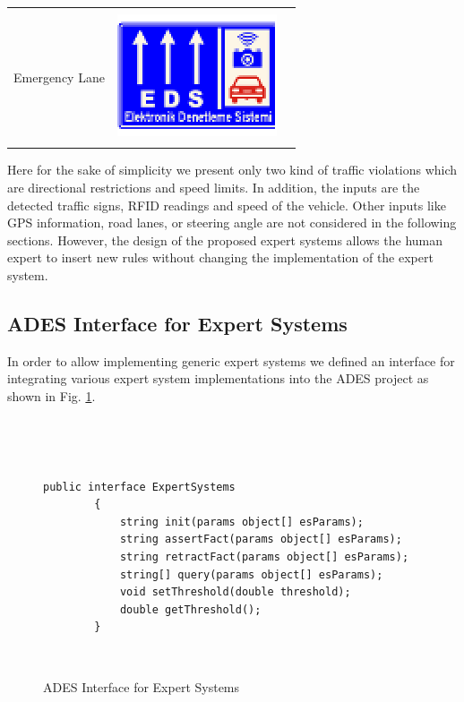 \documentclass[letterpaper, 10 pt, conference]{ieeeconf}
\newenvironment{mylisting}
{~\par~\begin{list}{}{\setlength{\leftmargin}{1em}}\item\scriptsize\bfseries}
{\end{list}~\par}
\begin{document}
\begin{table}[!ht]
{\begin{tabular}{|r|r|c|}
\cline{1-2}
&&\\
Emergency Lane &  \includegraphics[scale=0.25]{img/eds} & \\
&&\\
\hline
\end{tabular}  
}
\label{viol}
\end{table}

Here for the sake of simplicity we present only two kind of traffic violations which are directional restrictions and speed limits. In addition, the inputs are the detected traffic signs, RFID readings and speed of the vehicle. Other inputs like GPS information, road lanes, or steering angle are not considered in the following sections. However, the design of the proposed expert systems allows the human expert to insert new rules without changing the implementation of the expert system.

\subsection{ADES Interface for Expert Systems}

In order to allow implementing generic expert systems  we defined an interface for integrating various expert system implementations into the ADES project as shown in Fig. \ref{fig:interface}. 

\begin{figure}[!ht]
      \centering

\begin{mylisting}

\begin{verbatim}
public interface ExpertSystems
        {
            string init(params object[] esParams);
            string assertFact(params object[] esParams);
            string retractFact(params object[] esParams);
            string[] query(params object[] esParams);
            void setThreshold(double threshold);
            double getThreshold();
        }
\end{verbatim}
\end{mylisting}
      \caption{ADES Interface for Expert Systems}
      \label{fig:interface}
\end{figure}
\end{document}
